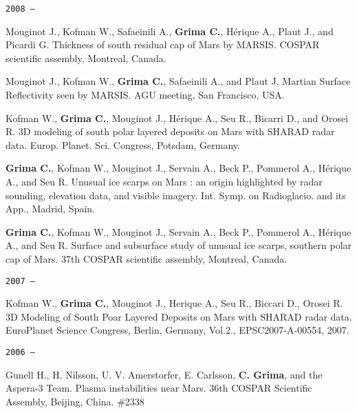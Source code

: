 \begin{etaremune}
\hspace{-2em}\texttt{2008 ---}

\item
  Mouginot J., Kofman W., Safaeinili A., \textbf{Grima C.}, Hérique A.,
  Plaut J., and Picardi G. Thickness of south residual cap of Mars by
  MARSIS. COSPAR scientific assembly, Montreal, Canada.
\item
  Mouginot J., Kofman W., \textbf{Grima C.}, Safaeinili A., and Plaut J.
  Martian Surface Reflectivity seen by MARSIS. AGU meeting, San
  Francisco, USA.
\item
  Kofman W., \textbf{Grima C.}, Mouginot J., Hérique A., Seu R., Bicarri
  D., and Orosei R. 3D modeling of south polar layered deposits on Mars
  with SHARAD radar data. Europ. Planet. Sci. Congress, Potsdam,
  Germany.
\item
  \textbf{Grima C.}, Kofman W., Mouginot J., Servain A., Beck P.,
  Pommerol A., Hérique A., and Seu R. Unusual ice scarps on Mars : an
  origin highlighted by radar sounding, elevation data, and visible
  imagery. Int. Symp. on Radioglacio. and its App., Madrid, Spain.
\item
  \textbf{Grima C.}, Kofman W., Mouginot J., Servain A., Beck P.,
  Pommerol A., Hérique A., and Seu R. Surface and subsurface study of
  unusual ice scarps, southern polar cap of Mars. 37th COSPAR scientific
  assembly, Montreal, Canada.

\hspace{-2em}\texttt{2007 ---}

\item
  Kofman W., \textbf{Grima C.}, Mouginot J., Herique A., Seu R., Biccari
  D., Orosei R. 3D Modeling of South Poar Layered Deposits on Mars with
  SHARAD radar data. EuroPlanet Science Congress, Berlin, Germany,
  Vol.2., EPSC2007-A-00554, 2007.

\hspace{-2em}\texttt{2006 ---}

\item
  Gunell H., H. Nilsson, U. V. Amerstorfer, E. Carlsson, \textbf{C. Grima}, and
  the Aspera-3 Team. Plasma instabilities near Mars. 36th COSPAR
  Scientific Assembly, Beijing, China. \#2338
  
\end{etaremune}